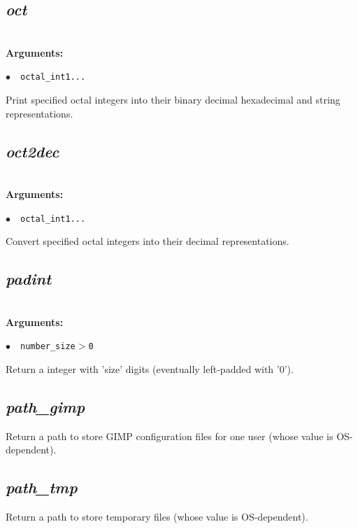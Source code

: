 \documentclass[a4paper,10.5pt,twoside]{book}
\def\comma{\discretionary{,}{}{,}}
\newcommand{\Cb}[1]{\textcolor{cb}{#1}}
\begin{document}
\subsection{\emph{oct} }\vspace*{-0.7em}
~\\\textbf{\Cb{Arguments: }}\begin{flushleft}
{\small \Cb{\hspace*{0.5cm}$\bullet$~~\texttt{octal\_int1{\comma}...}}}\end{flushleft}
Print specified octal integers into their binary{\comma} decimal{\comma} hexadecimal and string representations.


\subsection{\emph{oct2dec} }\vspace*{-0.7em}
~\\\textbf{\Cb{Arguments: }}\begin{flushleft}
{\small \Cb{\hspace*{0.5cm}$\bullet$~~\texttt{octal\_int1{\comma}...}}}\end{flushleft}
Convert specified octal integers into their decimal representations.


\subsection{\emph{padint} }\vspace*{-0.7em}
~\\\textbf{\Cb{Arguments: }}\begin{flushleft}
{\small \Cb{\hspace*{0.5cm}$\bullet$~~\texttt{number{\comma}\_size$>$0}}}\end{flushleft}
Return a integer with 'size' digits (eventually left-padded with '0').


\subsection{\emph{path\_gimp} }\vspace*{-0.7em}
Return a path to store GIMP configuration files for one user (whose value is OS-dependent).


\subsection{\emph{path\_tmp} }\vspace*{-0.7em}
Return a path to store temporary files (whose value is OS-dependent).
\end{document}
